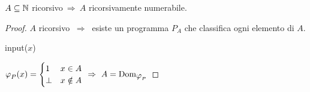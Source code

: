 \begin{theorem}
    $A\subseteq\mathbb{N}$ ricorsivo$\ \Rightarrow \ A$ ricorsivamente numerabile.
\end{theorem}
\begin{proof}
    $A$ ricorsivo $\ \Rightarrow \ $ esiste un programma $P_A$ che classifica ogni elemento
    di $A$.
    \hspace{1em}

    \begin{minipage}{.31\textwidth}
        \begin{tcolorbox}[
            colback=white,
            sharp corners,
            boxrule=.3mm,
            left=20pt,
            top=0pt,
            bottom=0pt,
            title=$P$,
            colbacktitle=white,
            coltitle=black
        ]
        \begin{algorithm}[H]
            \SetAlgoNoEnd
            input($x$)\;
             
        \end{algorithm}
        \end{tcolorbox}
    \end{minipage}
    \begin{minipage}{.49\textwidth}
        \hspace{3em}$\semRAM_P(x)=\begin{cases}
            1 & x\in A \\
            \perp & x\notin A
        \end{cases}\ \Rightarrow \ A=\text{Dom}_{\semRAM_P}$
    \end{minipage}\vspace{.6em}
\end{proof}

